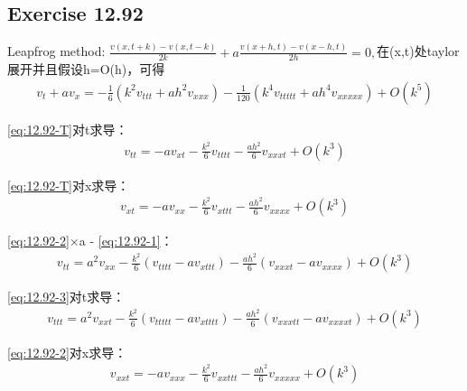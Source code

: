 \documentclass[UTF8]{ctexart}
\begin{document}
\subsection*{Exercise 12.92}
Leapfrog method:
$\frac{v(x,t+k)-v(x,t-k)}{2k} + a\frac{v(x+h,t) - v(x-h,t)}{2h} = 0,$在(x,t)处taylor展开并且假设h=O(h)，可得
\begin{equation}
    \label{eq:12.92-T}
    \begin{aligned}
        v_t + av_x = -\frac{1}{6}(k^2v_{ttt}+ah^2v_{xxx}) - \frac{1}{120}(k^4v_{ttttt}+ah^4v_{xxxxx}) + O(k^5)
    \end{aligned}
\end{equation}

\eqref{eq:12.92-T}对t求导：
\begin{equation}
    \label{eq:12.92-1}
    \begin{aligned}
        v_{tt} = -av_{xt} - \frac{k^2}{6}v_{tttt} - \frac{ah^2}{6}v_{xxxt} + O(k^3)
    \end{aligned}
\end{equation}

\eqref{eq:12.92-T}对x求导：
\begin{equation}
    \label{eq:12.92-2}
    \begin{aligned}
        v_{xt} = -av_{xx} - \frac{k^2}{6}v_{xttt} - \frac{ah^2}{6}v_{xxxx} + O(k^3)
    \end{aligned}
\end{equation}

\eqref{eq:12.92-2}$\times$a - \eqref{eq:12.92-1}：
\begin{equation}
    \label{eq:12.92-3}
    \begin{aligned}
        v_{tt} = a^2v_{xx} - \frac{k^2}{6}(v_{tttt} - av_{xttt}) - \frac{ah^2}{6}(v_{xxxt} - av_{xxxx}) + O(k^3)
    \end{aligned}
\end{equation}

\eqref{eq:12.92-3}对t求导：
\begin{equation}
    \label{eq:12.92-4}
    \begin{aligned}
        v_{ttt} = a^2v_{xxt} - \frac{k^2}{6}(v_{ttttt}-av_{xtttt}) - \frac{ah^2}{6}(v_{xxxtt}-av_{xxxxt}) + O(k^3)
    \end{aligned}
\end{equation}

\eqref{eq:12.92-2}对x求导：
\begin{equation}
    \label{eq:12.92-5}
    \begin{aligned}
        v_{xxt} = -av_{xxx} -\frac{k^2}{6}v_{xxttt} -\frac{ah^2}{6}v_{xxxxx} + O(k^3)
    \end{aligned}
\end{equation}
\end{document}
